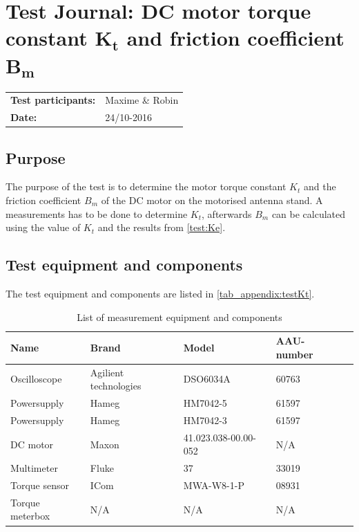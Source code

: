 \chapter{Test Journal: DC motor torque constant $\boldsymbol{K_t}$ and friction coefficient $\boldsymbol{B_m}$}\label{appendix:TJDCMotorTorqueConstant}
\begin{table}[!h]
\begin{tabular}{l l}
\textbf{Test participants:} & Maxime \& Robin\\
\textbf{Date:}  & 24/10-2016
\end{tabular}
\end{table}

\section*{Purpose}
The purpose of the test is to determine the motor torque constant $K_t$ and the friction coefficient $B_m$ of the DC motor on the motorised antenna stand. A measurements has to be done to determine $K_t$, afterwards $B_m$ can be calculated using the value of $K_t$ and the results from \autoref{test:Ke}.

\section*{Test equipment and components}
The test equipment and components are listed in \autoref{tab_appendix:testKt}.
\begin{table}[!h]
	\centering
	\caption{List of measurement equipment and components}\label{tab_appendix:testKt}

	\begin{tabularx}{\textwidth}{lXXXX}
		Name 				& Brand	& Model & AAU-number\\ \toprule \rowcolor{lightGrey}
		Oscilloscope	& Agilient technologies & DSO6034A & 60763	\\
		Powersupply	& Hameg & HM7042-5 & 61597\\ \rowcolor{lightGrey}
		Powersupply	& Hameg & HM7042-3 & 61597\\ 
		DC motor & Maxon & 41.023.038-00.00-052& N/A \\ \rowcolor{lightGrey}
		Multimeter & Fluke & 37 & 33019 \\
		Torque sensor & ICom & MWA-W8-1-P & 08931 \\ \rowcolor{lightGrey}
		Torque meterbox & N/A & N/A & N/A 
	\end{tabularx}
\end{table}

